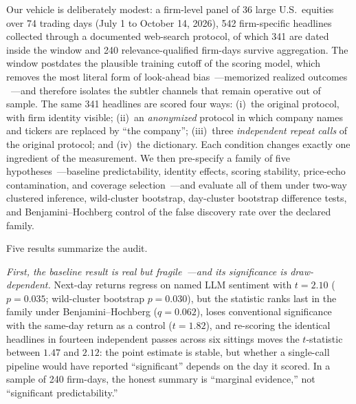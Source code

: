 Our vehicle is deliberately modest: a firm-level panel of 36 large U.S.\ equities over 74 trading days (July 1 to October 14, 2026), 542 firm-specific headlines collected through a documented web-search protocol, of which 341 are dated inside the window and 240 relevance-qualified firm-days survive aggregation. The window postdates the plausible training cutoff of the scoring model, which removes the most literal form of look-ahead bias~---memorized realized outcomes \citep{lopezlira2025,didisheim2025}~---and therefore isolates the subtler channels that remain operative out of sample. The same 341 headlines are scored four ways: (i)~the original protocol, with firm identity visible; (ii)~an \emph{anonymized} protocol in which company names and tickers are replaced by ``the company''; (iii)~three \emph{independent repeat calls} of the original protocol; and (iv)~the \citet{loughran2011} dictionary. Each condition changes exactly one ingredient of the measurement. We then pre-specify a family of five hypotheses~---baseline predictability, identity effects, scoring stability, price-echo contamination, and coverage selection~---and evaluate all of them under two-way clustered inference, wild-cluster bootstrap, day-cluster bootstrap difference tests, and Benjamini--Hochberg control of the false discovery rate over the declared family.

Five results summarize the audit.

\emph{First, the baseline result is real but fragile~---and its significance is draw-dependent.} Next-day returns regress on named LLM sentiment with $t=2.10$ ($p=0.035$; wild-cluster bootstrap $p=0.030$), but the statistic ranks last in the family under Benjamini--Hochberg ($q=0.062$), loses conventional significance with the same-day return as a control ($t=1.82$), and re-scoring the identical headlines in fourteen independent passes across six sittings moves the $t$-statistic between $1.47$ and $2.12$: the point estimate is stable, but whether a single-call pipeline would have reported ``significant'' depends on the day it scored. In a sample of 240 firm-days, the honest summary is ``marginal evidence,'' not ``significant predictability.''

